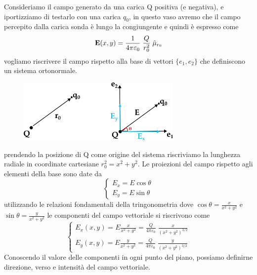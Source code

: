 \noindent Consideriamo il campo generato da una carica Q positiva (e negativa), e iportizziamo di testarlo con una carica $q_0$, in questo vaso avremo che il campo percepito dalla carica sonda \`e lungo la congiungente e quindi \`e espresso come
\begin{equation*}
	\bold{E}(x,y) = \frac{1}{4 \pi \varepsilon_0} \;
	\frac{Q}{r_0^2} \;\hat{\mu}_{r_0} 
\end{equation*} 
vogliamo riscrivere il campo rispetto alla base di vettori $\{e_1,e_2\}$ che definiscono un sistema ortonormale.

 
\begin{figure}[!ht]
\vspace{0.2in}
\includegraphics[width= 8cm]{images/decomp}	
\centering
\vspace{0.1in}
\end{figure}
prendendo la posizione di Q come origine del sistema riscriviamo la lunghezza radiale in coordinate cartesiane $r_0^2 = x^2 + y^2$. Le proiezioni del campo rispetto agli elementi della base sono date da 
\begin{equation*}
	\left \{ \begin{array}{l}
		E_x = E \cos\theta \\
		E_y = E \sin\theta 
	\end{array}\right.
\end{equation*}
utilizzando le relazioni fondamentali della tringonometria dove $\cos\theta = \frac{x}{x^2+y^2}$ e $\sin\theta = \frac{y}{x^2+y^2}$ le componenti del campo vettoriale si riscrivono come
\begin{equation*}
	\left \{ \begin{array}{l}
		E_x(x,y) = E  \frac{x}{x^2+y^2} = \frac{Q}{4 \pi \varepsilon_0} \; \frac{x}{(x^2+y^2)^{3/2}}\\
		E_y(x,y) = E \frac{y}{x^2+y^2}  = \frac{Q}{4 \pi \varepsilon_0} \; \frac{y}{(x^2+y^2)^{3/2}}
	\end{array}\right.
\end{equation*}
Conoscendo il valore delle componenti in ogni punto del piano, possiamo definirne direzione, verso e intensit\`a del campo vettoriale. 
